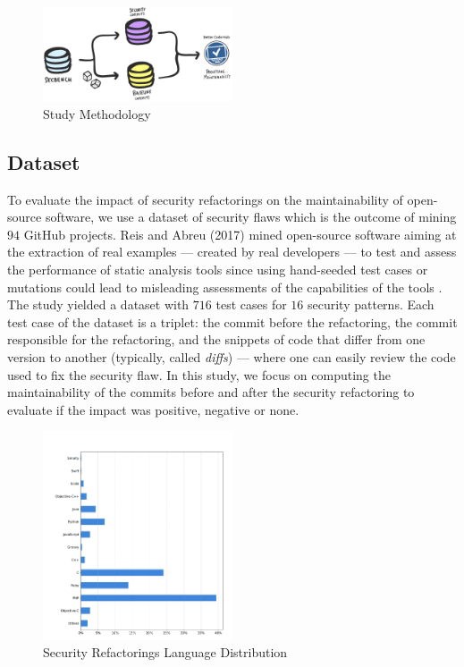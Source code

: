 \documentclass[10pt,conference]{IEEEtran}
\begin{document}
%
\begin{figure}[h]
 	\centering 	\includegraphics[width=0.5\textwidth]{figures/methodology.pdf}
 	\caption{Study Methodology}
	\label{fig:met}
\end{figure}
%
\subsection{Dataset}
%
To evaluate the impact of security refactorings on the maintainability of
open-source software, we use a dataset of security flaws which is the outcome of
mining $94$ GitHub projects. Reis and Abreu (2017) mined open-source
software aiming at the extraction of real examples --- created by real
developers --- to test and assess the performance of static analysis tools since
using hand-seeded test cases or mutations could lead to misleading assessments
of the capabilities of the tools \cite{just2014mutants}. The study yielded a
dataset with $716$ test cases for $16$ security patterns. Each test case of the
dataset is a triplet: the commit before the refactoring, the commit responsible
for the refactoring, and the snippets of code that differ from one version to
another (typically, called \textit{diffs}) --- where one can easily review the
code used to fix the security flaw. In this study, we focus on computing the
maintainability of the commits before and after the security refactoring to
evaluate if the impact was positive, negative or none.

\begin{figure}[h]
 	\centering 	\includegraphics[width=0.5\textwidth]{figures/language_dist.pdf}
 	\caption{Security Refactorings Language Distribution}
	\label{fig:lang}
\end{figure}
\end{document}
